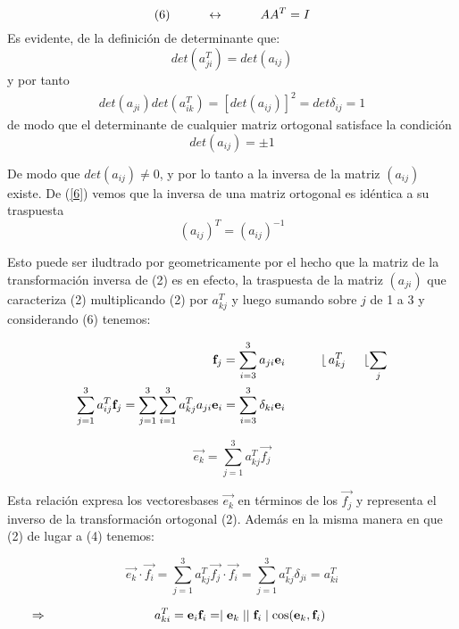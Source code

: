 $$(6)\hspace{1 cm}\leftrightarrow\hspace{1 cm} AA^T=I$$
Es evidente, de la definición de determinante que:
$$det(a^T_{ji})=det(a_{ij})$$
y por tanto
\begin{eqnarray*}
    det(a_{ji})det(a^T_{ik})=\left[det(a_{ij})\right]^2=det\delta_{ij}=1
  \end{eqnarray*}
de modo que el determinante de cualquier matriz ortogonal satisface la condición
\begin{equation}
    det(a_{ij})=\pm 1
    \label{eq:eq_7}
\end{equation}

De modo que $det(a_{ij})\neq0$, y por lo tanto a la inversa de la matriz $(a_{ij})$ existe. De (\ref{6}) vemos que la inversa de una matriz ortogonal es idéntica a su traspuesta
$$(a_{ij})^T=(a_{ij})^{-1}$$

Esto puede ser iludtrado por geometricamente por el hecho que la matriz de la transformación inversa de (2) es en efecto, la traspuesta de la matriz $(a_{ji})$ que caracteriza (2) multiplicando (2) por  $a^T_{kj}$ y luego sumando sobre $j$ de 1 a 3 y considerando (6) tenemos:

\begin{eqnarray*}
    \vec{f_j}=\sum^{3}_{i=3}a_{ji}\vec{e_i}&\hspace{1 cm}\lfloor\, a^T_{kj}\hspace{0.5 cm} \lfloor \sum_{j}\\
    \sum^{3}_{j=1}a^T_{ij}\vec{f_j}=\sum^{3}_{j=1}\sum^{3}_{i=1}a^T_{kj}a_{ji}\vec{e_i}=\sum^{3}_{i=3}\delta_{ki}\vec{e_i}&
\end{eqnarray*}

\begin{equation}
    \vec{e_k}=\sum^{3}_{j=1}a^{T}_{kj}\vec{f_j}
    \label{eq:eq_7}
\end{equation}

Esta relación expresa los vectoresbases $\vec{e_k}$ en términos de los $\vec{f_j}$ y representa el inverso de la transformación ortogonal (2). Además en la misma manera en que (2) de lugar a (4) tenemos:

$$
  \vec{e_k}\cdot\vec{f_i}=\sum^{3}_{j=1}a^T_{kj}\vec{f_j}\cdot\vec{f_i}=\sum^{3}_{j=1}a^T_{kj}\delta_{ji}=a^T_{ki}
$$

\begin{equation*}
    \Rightarrow \hspace{3 cm}a^T_{ki}=\vec{e_i}\vec{f_i}=\mid\vec{e_k}\mid\mid\vec{f_i}\mid\cos(\vec{e_k},\vec{f_i})\hspace{3 cm}
\end{equation*}

